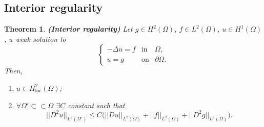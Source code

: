 \documentclass[12pt]{article}
\newtheorem{theorem}{Theorem}[section]
\theoremstyle{definition}
\begin{document}
\subsection{Interior regularity}
\begin{theorem}\label{interior_regularity}
\emph{\textbf{(Interior regularity)}} Let $g\in H^2(\Omega)$, $f\in L^2(\Omega)$, $u\in H^1(\Omega)$, $u$ weak solution to
\[\left\{\begin{array}{rcl}-\Delta u=f&\text{in}&\Omega,\\u=g&\text{on}&\partial\Omega.\end{array}\right.\]
Then,
\begin{enumerate}[label=(\roman*)]
\item $u\in H_\text{loc}^2(\Omega)$;
\item $\forall\Omega'\subset\subset\Omega$ $\exists C$ constant such that
\[||D^2u||_{L^2(\Omega')}\leq C\big(||Du||_{L^2(\Omega)}+||f||_{L^2(\Omega)}+||D^2g||_{L^2(\Omega)}\big).\]
\end{enumerate}
\end{theorem}
\end{document}

